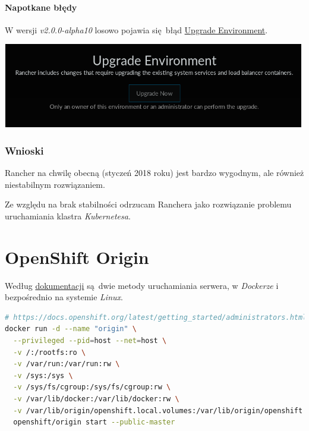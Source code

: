 \documentclass[a4paper,12pt,twoside,openany]{report}
\begin{document}
\hypertarget{napotkane-bux142ux119dy}{%
\paragraph{Napotkane błędy}\label{napotkane-bux142ux119dy}}

W wersji \emph{v2.0.0-alpha10} losowo pojawia się~błąd
\href{https://github.com/rancher/rancher/issues/10396}{Upgrade
Environment}.

\includegraphics[width=5.20833in,height=1.45833in]{assets/rancher2.0-error.png}\\

\hypertarget{wnioski-2}{%
\subsubsection{Wnioski}\label{wnioski-2}}

Rancher na chwilę obecną (styczeń 2018 roku) jest bardzo wygodnym, ale
również niestabilnym rozwiązaniem.

Ze względu na brak stabilności odrzucam Ranchera jako rozwiązanie
problemu uruchamiania klastra \emph{Kubernetesa}.

\hypertarget{openshift-origin-1}{%
\section{OpenShift Origin}\label{openshift-origin-1}}

Według
\href{https://docs.openshift.org/latest/getting_started/administrators.html}{dokumentacji}
są~dwie metody uruchamiania serwera, w \emph{Dockerze} i bezpośrednio na
systemie \emph{Linux}.

\begin{lstlisting}[language=bash]
# https://docs.openshift.org/latest/getting_started/administrators.html#installation-methods
docker run -d --name "origin" \
  --privileged --pid=host --net=host \
  -v /:/rootfs:ro \
  -v /var/run:/var/run:rw \
  -v /sys:/sys \
  -v /sys/fs/cgroup:/sys/fs/cgroup:rw \
  -v /var/lib/docker:/var/lib/docker:rw \
  -v /var/lib/origin/openshift.local.volumes:/var/lib/origin/openshift.local.volumes:rslave \
  openshift/origin start --public-master
\end{lstlisting}
\end{document}
